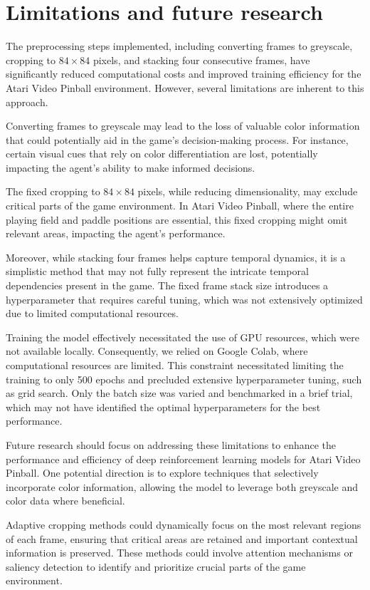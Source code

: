 \documentclass[twocolumn]{webofc}
\begin{document}
\section{Limitations and future research}
The preprocessing steps implemented, including converting frames to greyscale, cropping to \(84 \times 84\) pixels, and stacking four consecutive frames, have significantly reduced computational costs and improved training efficiency for the Atari Video Pinball environment. However, several limitations are inherent to this approach.

Converting frames to greyscale may lead to the loss of valuable color information that could potentially aid in the game's decision-making process. For instance, certain visual cues that rely on color differentiation are lost, potentially impacting the agent's ability to make informed decisions.

The fixed cropping to \(84 \times 84\) pixels, while reducing dimensionality, may exclude critical parts of the game environment. In Atari Video Pinball, where the entire playing field and paddle positions are essential, this fixed cropping might omit relevant areas, impacting the agent's performance.

Moreover, while stacking four frames helps capture temporal dynamics, it is a simplistic method that may not fully represent the intricate temporal dependencies present in the game. The fixed frame stack size introduces a hyperparameter that requires careful tuning, which was not extensively optimized due to limited computational resources.

Training the model effectively necessitated the use of GPU resources, which were not available locally. Consequently, we relied on Google Colab, where computational resources are limited. This constraint necessitated limiting the training to only 500 epochs and precluded extensive hyperparameter tuning, such as grid search. Only the batch size was varied and benchmarked in a brief trial, which may not have identified the optimal hyperparameters for the best performance.



Future research should focus on addressing these limitations to enhance the performance and efficiency of deep reinforcement learning models for Atari Video Pinball. One potential direction is to explore techniques that selectively incorporate color information, allowing the model to leverage both greyscale and color data where beneficial. 

Adaptive cropping methods could dynamically focus on the most relevant regions of each frame, ensuring that critical areas are retained and important contextual information is preserved. These methods could involve attention mechanisms or saliency detection to identify and prioritize crucial parts of the game environment.
\end{document}
